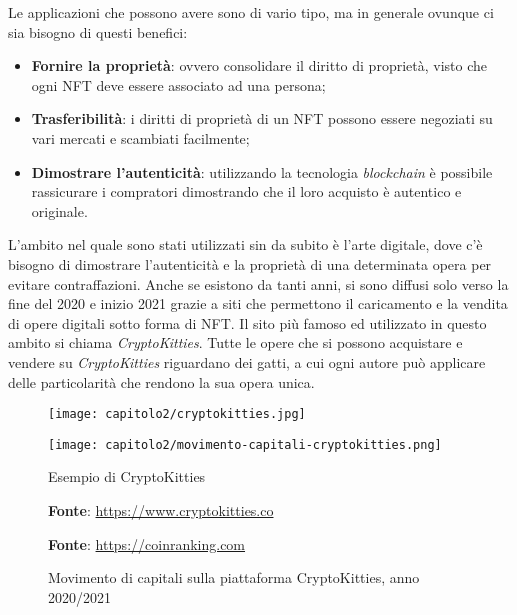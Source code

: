 \noindent Le applicazioni che possono avere sono di vario tipo, ma in generale ovunque ci sia bisogno di questi benefici:
\begin{itemize}
  \item \textbf{Fornire la proprietà}: ovvero consolidare il diritto di proprietà, visto che ogni NFT deve essere associato ad una persona;
  \item \textbf{Trasferibilità}: i diritti di proprietà di un NFT possono essere negoziati su vari mercati e scambiati facilmente;
  \item \textbf{Dimostrare l'autenticità}: utilizzando la tecnologia \textit{blockchain} è possibile rassicurare i compratori dimostrando che il loro acquisto è autentico e originale.
\end{itemize}

L'ambito nel quale sono stati utilizzati sin da subito è l'arte digitale, dove c'è bisogno di dimostrare l'autenticità e la proprietà di una determinata opera per evitare contraffazioni.
Anche se esistono da tanti anni, si sono diffusi solo verso la fine del 2020 e inizio 2021 grazie a siti che permettono il caricamento e la vendita di opere digitali sotto forma di NFT. Il sito più famoso ed utilizzato in questo ambito si chiama \textit{CryptoKitties}. Tutte le opere che si possono acquistare e vendere su \textit{CryptoKitties} riguardano dei gatti, a cui ogni autore può applicare delle particolarità che rendono la sua opera unica.

\begin{figure}[!tbph]
  \captionsetup{singlelinecheck = false, format= hang, justification=raggedright, font=footnotesize, labelsep=space}

  \centering

  \begin{minipage}{0.5\textwidth}
    \texttt{[image: capitolo2/cryptokitties.jpg]}
  \end{minipage}%
  \begin{minipage}{0.5\textwidth}
    \texttt{[image: capitolo2/movimento-capitali-cryptokitties.png]}
  \end{minipage}

  \begin{minipage}[t]{0.5\textwidth}
    \caption{Esempio di CryptoKitties}
    \textbf{Fonte}: \href{https://www.cryptokitties.co}{https://www.cryptokitties.co}
  \end{minipage}%
  \begin{minipage}[t]{0.5\textwidth}
    \caption{Movimento di capitali sulla piattaforma CryptoKitties, anno 2020/2021}
    \textbf{Fonte}: \href{https://coinranking.com/dapp/cryptokitties}{https://coinranking.com}
  \end{minipage}
\end{figure}

